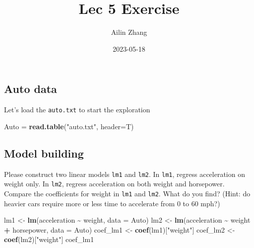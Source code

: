 \documentclass[
]{article}
\title{Lec 5 Exercise}
\author{Ailin Zhang}
\date{2023-05-18}
\newenvironment{Shaded}{\begin{snugshade}}{\end{snugshade}}
\newcommand{\AttributeTok}[1]{\textcolor[rgb]{0.13,0.29,0.53}{#1}}
\newcommand{\FunctionTok}[1]{\textcolor[rgb]{0.13,0.29,0.53}{\textbf{#1}}}
\newcommand{\NormalTok}[1]{#1}
\newcommand{\OtherTok}[1]{\textcolor[rgb]{0.56,0.35,0.01}{#1}}
\newcommand{\SpecialCharTok}[1]{\textcolor[rgb]{0.81,0.36,0.00}{\textbf{#1}}}
\newcommand{\StringTok}[1]{\textcolor[rgb]{0.31,0.60,0.02}{#1}}
\begin{document}
\maketitle

\hypertarget{auto-data}{%
\subsection{Auto data}\label{auto-data}}

Let's load the \texttt{auto.txt} to start the exploration

\begin{Shaded}
\begin{Highlighting}[]
\NormalTok{Auto }\OtherTok{=} \FunctionTok{read.table}\NormalTok{(}\StringTok{"auto.txt"}\NormalTok{, }\AttributeTok{header=}\NormalTok{T)}
\end{Highlighting}
\end{Shaded}

\hypertarget{model-building}{%
\subsection{Model building}\label{model-building}}

Please construct two linear models \texttt{lm1} and \texttt{lm2}. In
\texttt{lm1}, regress acceleration on weight only. In \texttt{lm2},
regress acceleration on both weight and horsepower. Compare the
coefficients for weight in \texttt{lm1} and \texttt{lm2}. What do you
find? (Hint: do heavier cars require more or less time to accelerate
from 0 to 60 mph?)

\begin{Shaded}
\begin{Highlighting}[]
\NormalTok{lm1 }\OtherTok{\textless{}{-}} \FunctionTok{lm}\NormalTok{(acceleration }\SpecialCharTok{\textasciitilde{}}\NormalTok{ weight, }\AttributeTok{data =}\NormalTok{ Auto)}
\NormalTok{lm2 }\OtherTok{\textless{}{-}} \FunctionTok{lm}\NormalTok{(acceleration }\SpecialCharTok{\textasciitilde{}}\NormalTok{ weight }\SpecialCharTok{+}\NormalTok{ horsepower, }\AttributeTok{data =}\NormalTok{ Auto)}
\NormalTok{coef\_lm1 }\OtherTok{\textless{}{-}} \FunctionTok{coef}\NormalTok{(lm1)[}\StringTok{"weight"}\NormalTok{]}
\NormalTok{coef\_lm2 }\OtherTok{\textless{}{-}} \FunctionTok{coef}\NormalTok{(lm2)[}\StringTok{"weight"}\NormalTok{]}
\NormalTok{coef\_lm1}
\end{Highlighting}
\end{Shaded}
\end{document}
